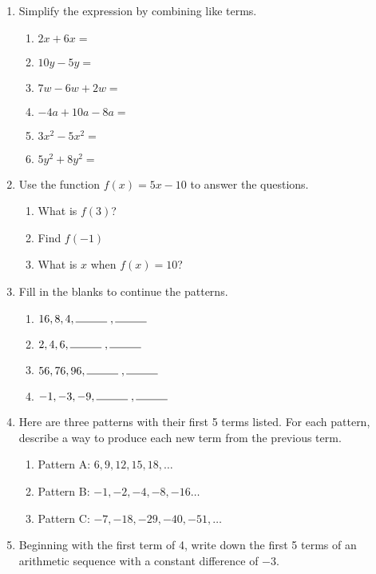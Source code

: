 \documentclass[12pt, twoside]{article}
\begin{document}
\begin{enumerate}[itemsep=0.5cm]
\item Simplify the expression by combining like terms.
    \begin{multicols}{2}
        \begin{enumerate}[itemsep=0.5cm]
            \item $2x + 6x =$
            \item $10y - 5y =$
            \item $7w - 6w + 2w =$
            \item $-4a + 10a - 8a =$
            \item $3x^2 - 5x^2 =$
            \item $5y^2 + 8y^2 =$
        \end{enumerate}
    \end{multicols}

\newpage
\item Use the function $f(x) = 5x-10$ to answer the questions.
\begin{multicols}{2}
\begin{enumerate}[itemsep=1cm]
    \item What is $f(3)$?
    \item Find $f(-1)$
    \item What is $x$ when $f(x) = 10$?
\end{enumerate}
\end{multicols} \vspace{1cm}

\item Fill in the blanks to continue the patterns.\vspace{0.5cm}
\begin{multicols}{2}
\begin{enumerate}[itemsep=1cm]
    \item $16,8,4, \rule{1cm}{0.15mm} \;, \rule{1cm}{0.15mm}$
    \item $2,4,6, \rule{1cm}{0.15mm} \;, \rule{1cm}{0.15mm}$
    \item $56,76,96, \rule{1cm}{0.15mm} \;, \rule{1cm}{0.15mm}$
    \item $-1, -3, -9, \rule{1cm}{0.15mm} \;, \rule{1cm}{0.15mm}$
\end{enumerate}
\end{multicols}

\item Here are three patterns with their first 5 terms listed. For each pattern, describe a way to produce each new term from the previous term.
\begin{enumerate}[itemsep=1cm]
    \item Pattern A: $6,9,12,15,18, \dots$
    \item Pattern B: $-1,-2,-4,-8,-16 \dots$
    \item Pattern C: $-7,-18,-29,-40,-51, \dots$
\end{enumerate} \vspace{1cm}

\item Beginning with the first term of 4, write down the first 5 terms of an arithmetic sequence with a constant difference of $-3$.

\end{enumerate}
\end{document}
